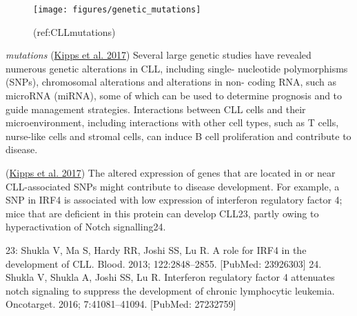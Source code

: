 \documentclass[11pt, a4paper, twosided]{book}
\begin{document}
\begin{figure}

{\centering \texttt{[image: figures/genetic\_mutations]} 

}

\caption{(ref:CLLmutations)}\label{fig:CLLmutations}
\end{figure}
\emph{mutations}
(\protect\hyperlink{ref-Kipps2017}{Kipps et al. 2017})
Several large genetic studies have revealed numerous genetic alterations in CLL, including single- nucleotide polymorphisms (SNPs), chromosomal alterations and alterations in non- coding RNA, such as microRNA (miRNA), some of which can be used to determine prognosis and to guide management strategies. Interactions between CLL cells and their microenvironment, including interactions with other cell types, such as T cells, nurse-like cells and stromal cells, can induce B cell proliferation and contribute to disease.

(\protect\hyperlink{ref-Kipps2017}{Kipps et al. 2017})
The altered expression of genes that are located in or near CLL-associated SNPs might contribute to disease development. For example, a SNP in IRF4 is associated with low expression of interferon regulatory factor 4; mice that are deficient in this protein can develop CLL23, partly owing to hyperactivation of Notch signalling24.

23: Shukla V, Ma S, Hardy RR, Joshi SS, Lu R. A role for IRF4 in the development of CLL. Blood. 2013; 122:2848--2855. {[}PubMed: 23926303{]}
24. Shukla V, Shukla A, Joshi SS, Lu R. Interferon regulatory factor 4 attenuates notch signaling to suppress the development of chronic lymphocytic leukemia. Oncotarget. 2016; 7:41081--41094. {[}PubMed: 27232759{]}
\end{document}
